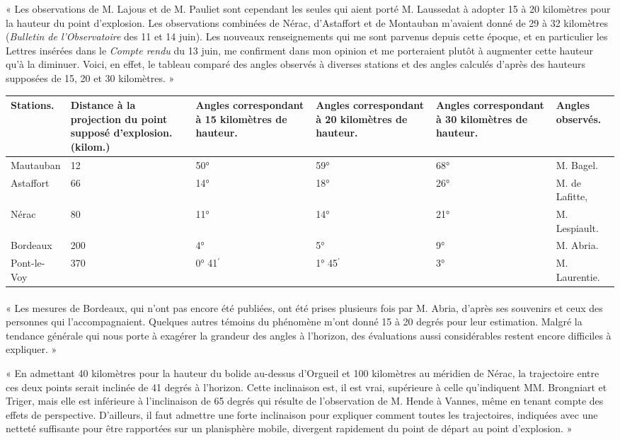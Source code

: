 \documentclass[a4paper, 11pt, oneside, polutonikogreek, french]{article}
\begin{document}
« Les observations de M. Lajous et de M. Pauliet sont cependant les seules qui aient porté M. Laussedat à adopter 15 à 20 kilomètres pour la hauteur du point d'explosion. Les observations combinées de Nérac, d'Astaffort et de Montauban m'avaient donné de 29 à 32 kilomètres (\emph{Bulletin de l'Observatoire} des 11 et 14 juin). Les nouveaux renseignements qui me sont parvenus depuis cette époque, et en particulier les Lettres insérées dans le \emph{Compte rendu} du 13 juin, me confirment dans mon opinion et me porteraient plutôt à augmenter cette hauteur qu'à la diminuer. Voici, en effet, le tableau comparé des angles observés à diverses stations et des angles calculés d'après des hauteurs supposées de 15, 20 et 30 kilomètres. »
\begin{table}[H]
    \centering\small
    \begin{tabular}{|l|p{18mm}|p{15mm}|p{15mm}|p{15mm}|p{21mm}|}
    \hline
        Stations. & Distance à la projection du point supposé d'explosion. (kilom.) & Angles correspondant à 15 kilomètres de hauteur. & Angles correspondant à 20 kilomètres de hauteur. & Angles correspondant à 30 kilomètres de hauteur. & Angles observés. \\ \hline
        Mautauban & 12 & 50° & 59° & 68° & M. Bagel. \\ \hline
        Astaffort & 66 & 14° & 18° & 26° & M. de Lafitte, \\ \hline
        Nérac & 80 & 11° & 14° & 21° & M. Lespiault. \\ \hline
        Bordeaux & 200 & 4° & 5° & 9° & M. Abria. \\ \hline
        Pont-le-Voy & 370 & 0° 41$^{\prime}$ & 1° 45$^{\prime}$ & 3° & M. Laurentie. \\ \hline
    \end{tabular}
\end{table}
\paragraph{}
« Les mesures de Bordeaux, qui n'ont pas encore été publiées, ont été prises plusieurs fois par M. Abria, d'après ses souvenirs et ceux des personnes qui l'accompagnaient. Quelques autres témoins du phénomène m'ont donné 15 à 20 degrés pour leur estimation. Malgré la tendance générale qui nous porte à exagérer la grandeur des angles à l'horizon, des évaluations aussi considérables restent encore difficiles à expliquer. »

« En admettant 40 kilomètres pour la hauteur du bolide au-dessus d'Orgueil et 100 kilomètres au méridien de Nérac, la trajectoire entre ces deux points serait inclinée de 41 degrés à l'horizon. Cette inclinaison est, il est vrai, supérieure à celle qu'indiquent MM. Brongniart et Triger, mais elle est inférieure à l'inclinaison de 65 degrés qui résulte de l'observation de M. Hende à Vannes, même en tenant compte des effets de perspective. D'ailleurs, il faut admettre une forte inclinaison pour expliquer comment toutes les trajectoires, indiquées avec une netteté suffisante pour être rapportées sur un planisphère mobile, divergent rapidement du point de départ au point d'explosion. »
\clearpage
\end{document}
